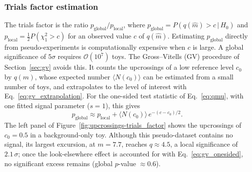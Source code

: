 \subsubsection{Trials factor estimation}\label{sec:exp_tf}
The trials factor is the ratio $p_\text{global}/p_\text{local}$, where $p_\text{global}=P(q(\hat m)>c\,|\,H_0)$ and $p_\text{local}=\tfrac12P(\chi^2_1>c)$ for an observed value $c$ of $q(\hat m)$. Estimating $p_\text{global}$ directly from pseudo-experiments is computationally expensive when $c$ is large. A global significance of $5\sigma$ requires $\mathcal{O}(10^7)$ toys. The Gross--Vitells (GV) procedure of Section~\ref{sec:gv} avoids this. It counts the upcrossings of a low reference level $c_0$ by $q(m)$, whose expected number $\langle N(c_0)\rangle$ can be estimated from a small number of toys, and extrapolates to the level of interest with Eq.~\eqref{eq:gv_extrapolation}. For the one-sided test statistic of Eq.~\eqref{eq:qmu}, with one fitted signal parameter ($s=1$), this gives
\begin{equation}
  p_\text{global}\approx p_\text{local}+\langle N(c_0)\rangle\,e^{-(c-c_0)/2}.
  \label{eq:gv_onesided}
\end{equation}
The left panel of Figure~\ref{fig:upcrossings-trials_factor} shows the upcrossings of $c_0=0.5$ in a background-only toy.
Although this pseudo-dataset contains no signal, its largest excursion, at $m=7.7$, reaches $q\approx4.5$, a local significance of $2.1\,\sigma$; once the look-elsewhere effect is accounted for with Eq.~\eqref{eq:gv_onesided}, no significant excess remains (global $p$-value $\approx0.6$).

